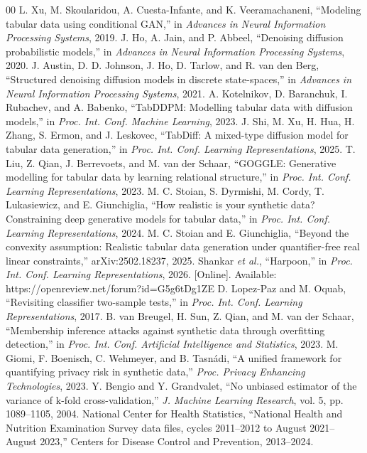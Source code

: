 \documentclass[conference]{IEEEtran}
\begin{document}
\begin{thebibliography}{00}
 L. Xu, M. Skoularidou, A. Cuesta-Infante, and K. Veeramachaneni, ``Modeling tabular data using conditional GAN,'' in \textit{Advances in Neural Information Processing Systems}, 2019.
 J. Ho, A. Jain, and P. Abbeel, ``Denoising diffusion probabilistic models,'' in \textit{Advances in Neural Information Processing Systems}, 2020.
 J. Austin, D. D. Johnson, J. Ho, D. Tarlow, and R. van den Berg, ``Structured denoising diffusion models in discrete state-spaces,'' in \textit{Advances in Neural Information Processing Systems}, 2021.
 A. Kotelnikov, D. Baranchuk, I. Rubachev, and A. Babenko, ``TabDDPM: Modelling tabular data with diffusion models,'' in \textit{Proc. Int. Conf. Machine Learning}, 2023.
 J. Shi, M. Xu, H. Hua, H. Zhang, S. Ermon, and J. Leskovec, ``TabDiff: A mixed-type diffusion model for tabular data generation,'' in \textit{Proc. Int. Conf. Learning Representations}, 2025.
 T. Liu, Z. Qian, J. Berrevoets, and M. van der Schaar, ``GOGGLE: Generative modelling for tabular data by learning relational structure,'' in \textit{Proc. Int. Conf. Learning Representations}, 2023.
 M. C. Stoian, S. Dyrmishi, M. Cordy, T. Lukasiewicz, and E. Giunchiglia, ``How realistic is your synthetic data? Constraining deep generative models for tabular data,'' in \textit{Proc. Int. Conf. Learning Representations}, 2024.
 M. C. Stoian and E. Giunchiglia, ``Beyond the convexity assumption: Realistic tabular data generation under quantifier-free real linear constraints,'' arXiv:2502.18237, 2025.
 Shankar \textit{et al.}, ``Harpoon,'' in \textit{Proc. Int. Conf. Learning Representations}, 2026. [Online]. Available: https://openreview.net/forum?id=G5g6tDg1ZE
 D. Lopez-Paz and M. Oquab, ``Revisiting classifier two-sample tests,'' in \textit{Proc. Int. Conf. Learning Representations}, 2017.
 B. van Breugel, H. Sun, Z. Qian, and M. van der Schaar, ``Membership inference attacks against synthetic data through overfitting detection,'' in \textit{Proc. Int. Conf. Artificial Intelligence and Statistics}, 2023.
 M. Giomi, F. Boenisch, C. Wehmeyer, and B. Tasn\'adi, ``A unified framework for quantifying privacy risk in synthetic data,'' \textit{Proc. Privacy Enhancing Technologies}, 2023.
 Y. Bengio and Y. Grandvalet, ``No unbiased estimator of the variance of k-fold cross-validation,'' \textit{J. Machine Learning Research}, vol. 5, pp. 1089--1105, 2004.
 National Center for Health Statistics, ``National Health and Nutrition Examination Survey data files, cycles 2011--2012 to August 2021--August 2023,'' Centers for Disease Control and Prevention, 2013--2024.
\end{thebibliography}
\end{document}
